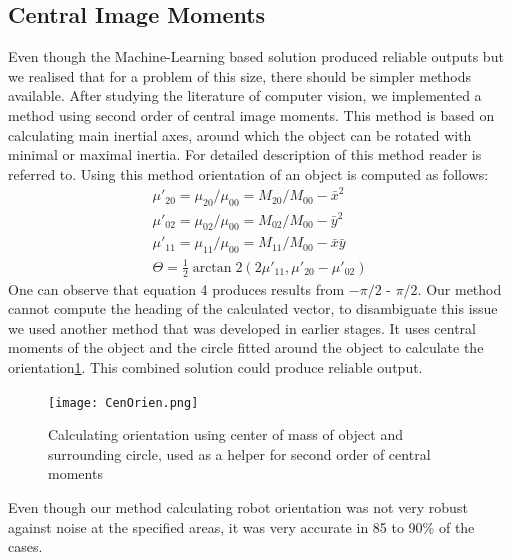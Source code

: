 \subsection{Central Image Moments}
Even though the Machine-Learning based solution produced reliable outputs but we realised that for a problem of this size, there should be simpler methods available. After studying the literature of computer vision, we implemented a method using second order of central image moments. This method is based on calculating main inertial axes, around which the object can be rotated with minimal or maximal inertia. For detailed description of this method reader is referred to\cite{Teague:80}. Using this method orientation of an object is computed as follows:
\begin{align}
\label{equ:centroid}
\mu'_{20} = \mu_{20} / \mu_{00} = M_{20}/M_{00} - \bar{x}^2 \\
\mu'_{02} = \mu_{02} / \mu_{00} = M_{02}/M_{00} - \bar{y}^2 \\
\mu'_{11} = \mu_{11} / \mu_{00} = M_{11}/M_{00} - \bar{x}\bar{y} \\
\Theta = \frac{1}{2} \arctan2 \left( {2\mu'_{11}},{\mu'_{20} - \mu'_{02}} \right) \label{orientationEq}
\end{align}
One can observe that equation 4 produces results from $-\pi/2$ - $\pi/2$. Our method cannot compute the heading of the calculated vector, to disambiguate this issue we used another method that was developed in earlier stages. It uses central moments of the object and the circle fitted around the object to calculate the orientation\ref{fig:CircleMethod}. This combined solution could produce reliable output. 
\begin{figure}[htp]
\begin{center}
\leavevmode
\texttt{[image: CenOrien.png]}
\end{center}
\caption{Calculating orientation using center of mass of object and surrounding circle, used as a helper for second order of central moments}
\label{fig:CircleMethod}
\end{figure} 
Even though our method calculating robot orientation was not very robust against noise at the specified areas, it was very accurate in 85 to 90\% of the cases. 
